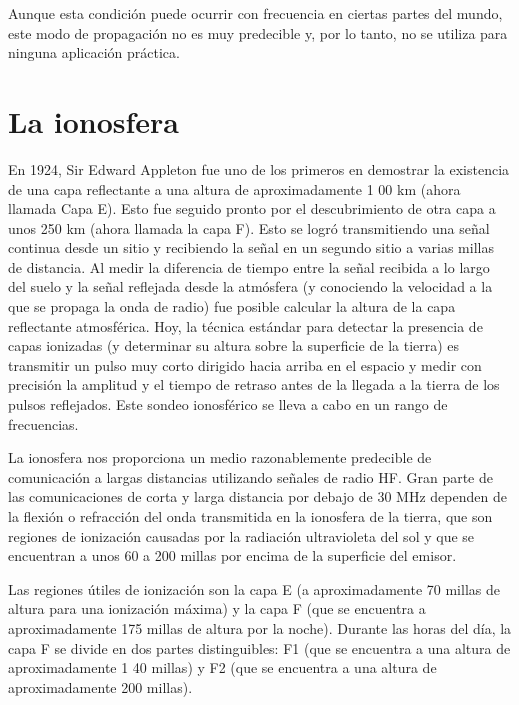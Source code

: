 Aunque esta condición puede ocurrir con frecuencia en ciertas partes del mundo, este modo de propagación no es muy predecible y, por lo tanto, no se utiliza para ninguna aplicación práctica.


\section{La ionosfera}
\label{sec:A.08.ionosfera}

En 1924, Sir Edward Appleton fue uno de los primeros en demostrar la existencia de una capa reflectante a una altura de aproximadamente 1 00 km (ahora llamada Capa E). Esto fue seguido pronto por el descubrimiento de otra capa a unos 250 km (ahora llamada la capa F). Esto se logró transmitiendo una señal continua desde un sitio y recibiendo la señal en un segundo sitio a varias millas de distancia. Al medir la diferencia de tiempo entre la señal recibida a lo largo del suelo y la señal reflejada desde la atmósfera (y conociendo la velocidad a la que se propaga la onda de radio) fue posible calcular la altura de la capa reflectante atmosférica. Hoy, la técnica estándar para detectar la presencia de capas ionizadas (y determinar su altura sobre la superficie de la tierra) es transmitir un pulso muy corto dirigido hacia arriba en el espacio y medir con precisión la amplitud y el tiempo de retraso antes de la llegada a la tierra de los pulsos reflejados. Este sondeo ionosférico se lleva a cabo en un rango de frecuencias.

La ionosfera nos proporciona un medio razonablemente predecible de comunicación a largas distancias utilizando señales de radio HF. Gran parte de las comunicaciones de corta y larga distancia por debajo de 30 MHz dependen de la flexión o refracción del onda transmitida en la ionosfera de la tierra, que son regiones de ionización causadas por la radiación ultravioleta del sol y que se encuentran a unos 60 a 200 millas por encima de la superficie del emisor.

Las regiones útiles de ionización son la capa E (a aproximadamente 70 millas de altura para una ionización máxima) y la capa F (que se encuentra a aproximadamente 175 millas de altura por la noche). Durante las horas del día, la capa F se divide en dos partes distinguibles: F1 (que se encuentra a una altura de aproximadamente 1 40 millas) y F2 (que se encuentra a una altura de aproximadamente 200 millas).

